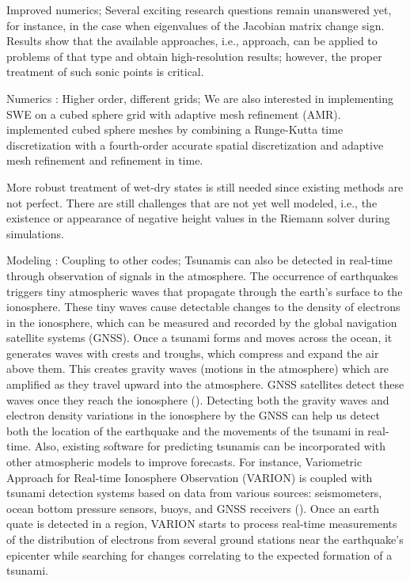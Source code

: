 \documentclass[10pt,a4paper]{article}
\begin{document}
Improved numerics; Several exciting research questions remain unanswered yet, for instance, in the case when eigenvalues of the Jacobian matrix  change sign. Results show that the available approaches, i.e.,  \citet{ba-le-mi-ro:2003} approach, can be applied to problems of that type and obtain high-resolution results; however, the proper treatment of such sonic points is critical.

Numerics : Higher order, different grids; We are also interested in implementing SWE on a cubed sphere grid with adaptive mesh refinement (AMR).  \citet{mccorquodale2015adaptive} implemented cubed sphere meshes by combining a Runge-Kutta time discretization with a fourth-order accurate spatial discretization and adaptive mesh refinement and refinement in time.  
	
More robust treatment of wet-dry states is still needed since existing methods are not perfect. There are still challenges that are not yet well modeled, i.e., the existence or appearance of negative height values in the Riemann solver during simulations.
	

Modeling : Coupling to other codes; Tsunamis can also be detected in real-time through observation of signals in the atmosphere. The occurrence of earthquakes triggers tiny atmospheric waves that propagate through the earth's surface to the ionosphere. These tiny waves cause detectable changes to the density of electrons in the ionosphere, which can be measured and recorded by the global navigation satellite systems (GNSS). 
Once a tsunami forms and moves across the ocean, it generates waves with crests and troughs, which compress and expand the air above them. This creates gravity waves (motions in the atmosphere) which are amplified as they travel upward into the atmosphere.  GNSS satellites detect these waves once they reach the ionosphere (\cite{meng2015new,hickey2009propagation}).  Detecting both the gravity waves and electron density variations in the ionosphere by the GNSS can help us detect both the location of the earthquake and the movements of the tsunami in real-time. 
Also, existing software for predicting tsunamis can be incorporated with other atmospheric models to improve forecasts. For instance, Variometric Approach for Real-time Ionosphere Observation (VARION)  is coupled with tsunami detection systems based on data from various sources: seismometers, ocean bottom pressure sensors, buoys, and GNSS receivers (\cite{savastano2017real}). Once an earth quate is detected in a region, VARION starts to process real-time measurements of the distribution of electrons from several ground stations near the earthquake's epicenter while searching for changes correlating to the expected formation of a tsunami.
\end{document}
